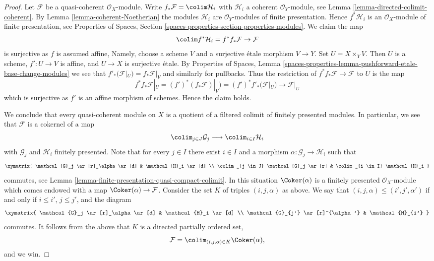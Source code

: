 \begin{proof}
Let $\mathcal{F}$ be a quasi-coherent $\mathcal{O}_X$-module.
Write $f_*\mathcal{F} = \colim \mathcal{H}_i$ with $\mathcal{H}_i$
a coherent $\mathcal{O}_Y$-module, see
Lemma \ref{lemma-directed-colimit-coherent}.
By Lemma \ref{lemma-coherent-Noetherian} the modules $\mathcal{H}_i$
are $\mathcal{O}_Y$-modules of finite presentation. Hence
$f^*\mathcal{H}_i$ is an $\mathcal{O}_X$-module of finite presentation, see
Properties of Spaces, Section
\ref{spaces-properties-section-properties-modules}.
We claim the map
$$
\colim f^*\mathcal{H}_i = f^*f_*\mathcal{F} \to \mathcal{F}
$$
is surjective as $f$ is assumed affine, Namely, choose
a scheme $V$ and a surjective \'etale morphism $V \to Y$. Set
$U = X \times_Y V$. Then $U$ is a scheme, $f' : U \to V$ is affine, and
$U \to X$ is surjective \'etale. By
Properties of Spaces, Lemma
\ref{spaces-properties-lemma-pushforward-etale-base-change-modules}
we see that $f'_*(\mathcal{F}|_U) = f_*\mathcal{F}|_V$ and similarly
for pullbacks. Thus the restriction of $f^*f_*\mathcal{F} \to \mathcal{F}$
to $U$ is the map
$$
f^*f_*\mathcal{F}|_U = (f')^*(f_*\mathcal{F})|_V) =
(f')^*f'_*(\mathcal{F}|_U) \to \mathcal{F}|_U
$$
which is surjective as $f'$ is an affine morphism of schemes.
Hence the claim holds.

\medskip\noindent
We conclude that every quasi-coherent module on $X$ is a quotient of a
filtered colimit of finitely presented modules. In particular, we see that
$\mathcal{F}$ is a cokernel of a map
$$
\colim_{j \in J} \mathcal{G}_j \longrightarrow \colim_{i \in I} \mathcal{H}_i
$$
with $\mathcal{G}_j$ and $\mathcal{H}_i$ finitely presented. Note
that for every $j \in I$ there exist $i \in I$ and a morphism
$\alpha : \mathcal{G}_j \to \mathcal{H}_i$ such that
$$
\xymatrix{
\mathcal{G}_j \ar[r]_\alpha \ar[d] & \mathcal{H}_i \ar[d] \\
\colim_{j \in J} \mathcal{G}_j \ar[r] &
\colim_{i \in I} \mathcal{H}_i
}
$$
commutes, see
Lemma \ref{lemma-finite-presentation-quasi-compact-colimit}.
In this situation $\Coker(\alpha)$ is a finitely presented
$\mathcal{O}_X$-module which comes endowed with a map
$\Coker(\alpha) \to \mathcal{F}$. Consider the set $K$ of
triples $(i, j, \alpha)$ as above. We say that
$(i, j, \alpha) \leq (i', j', \alpha')$ if and only if
$i \leq i'$, $j \leq j'$, and the diagram
$$
\xymatrix{
\mathcal{G}_j \ar[r]_\alpha \ar[d] & \mathcal{H}_i \ar[d] \\
\mathcal{G}_{j'} \ar[r]^{\alpha'} &
\mathcal{H}_{i'}
}
$$
commutes. It follows from the above that $K$ is a directed
partially ordered set,
$$
\mathcal{F} = \colim_{(i, j, \alpha) \in K} \Coker(\alpha),
$$
and we win.
\end{proof}






